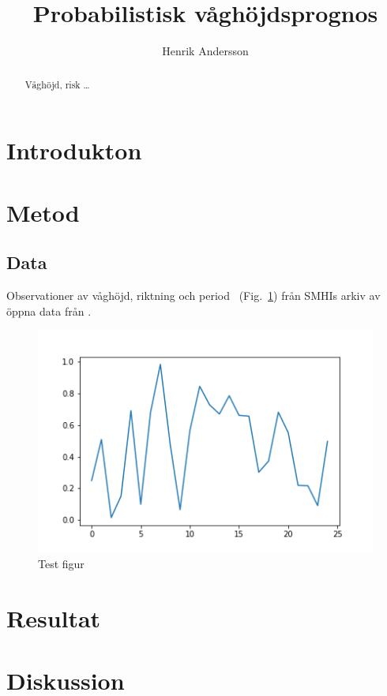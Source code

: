 \documentclass{article}
\author{Henrik Andersson}
\title{Probabilistisk våghöjdsprognos}
\begin{document}
\maketitle
    
\begin{abstract}
Våghöjd, risk \ldots
\end{abstract}

\section{Introdukton}

\citep{deo01}

\section{Metod}

\subsection{Data}

Observationer av våghöjd, riktning och period ~(Fig.~\ref{fig:data-test}) från SMHIs arkiv av öppna data från \citet{smhi}.

\begin{figure}
    \includegraphics{fig/test}
    \caption{Test figur}
    \label{fig:data-test}
\end{figure}

\section{Resultat}

\section{Diskussion}



\end{document}
